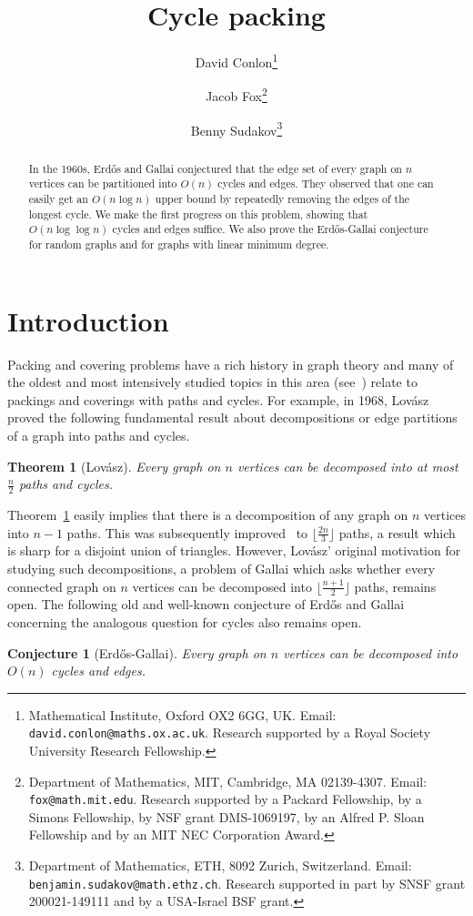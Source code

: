 \documentclass[11pt]{article}
\title{\vspace{-0.7cm}Cycle packing}
\author{David Conlon\thanks{Mathematical Institute, Oxford OX2 6GG, UK. Email: {\tt david.conlon@maths.ox.ac.uk}. Research supported by a Royal Society University Research Fellowship.} \and Jacob Fox\thanks{Department of Mathematics, MIT, Cambridge, MA 02139-4307. Email: {\tt fox@math.mit.edu}. Research supported by a Packard Fellowship, by a Simons Fellowship, by NSF grant DMS-1069197, by an Alfred P. Sloan Fellowship and by an MIT NEC Corporation Award.} \and Benny Sudakov\thanks{
Department of Mathematics, ETH, 8092 Zurich, Switzerland. Email: {\tt benjamin.sudakov@math.ethz.ch}. Research supported in part by SNSF grant 200021-149111 and by a USA-Israel BSF grant.}}
\date{}
\newtheorem{theorem}{Theorem}[section]
\newtheorem{conjecture}{Conjecture}
\begin{document}
\maketitle

\begin{abstract}
In the 1960s, Erd\H{o}s and Gallai conjectured that the edge set of every graph on $n$ vertices can be partitioned into $O(n)$ cycles and edges. They observed that one can easily get an $O(n \log n)$ upper bound by repeatedly removing the edges of the longest cycle. We make the first progress on this problem, showing that $O(n \log \log n)$ cycles and edges suffice. We also prove the Erd\H{o}s-Gallai conjecture for random graphs and for graphs with linear minimum degree.
\end{abstract}

\section{Introduction}

Packing and covering problems have a rich history in graph theory and many of the oldest and most intensively studied topics in this area (see~\cite{P92}) relate to packings and coverings with paths and cycles. For example, in 1968, Lov\'asz~\cite{L68} proved the following fundamental result about decompositions or edge partitions of a graph into paths and cycles.

\begin{theorem}[Lov\'asz] \label{Lovaszlem}
Every graph on $n$ vertices can be decomposed into at most $\frac{n}{2}$ paths and cycles.
\end{theorem}

Theorem~\ref{Lovaszlem} easily implies that there is a decomposition of any graph on $n$ vertices into $n - 1$ paths. This was subsequently improved~\cite{DK00, Y98} to $\lfloor \frac{2n}{3} \rfloor$ paths, a result which is sharp for a disjoint union of triangles. However, Lov\'asz' original motivation for studying such decompositions, a problem of Gallai which asks whether every connected graph on $n$ vertices can be decomposed into $\lfloor \frac{n+1}{2} \rfloor$ paths, remains open. The following old and well-known conjecture of Erd\H{o}s and Gallai~\cite{E83,EGP66} concerning the analogous question for cycles also remains open.

\begin{conjecture}[Erd\H{o}s-Gallai]
Every graph on $n$ vertices can be decomposed into $O(n)$ cycles and edges.
\end{conjecture}
\end{document}
